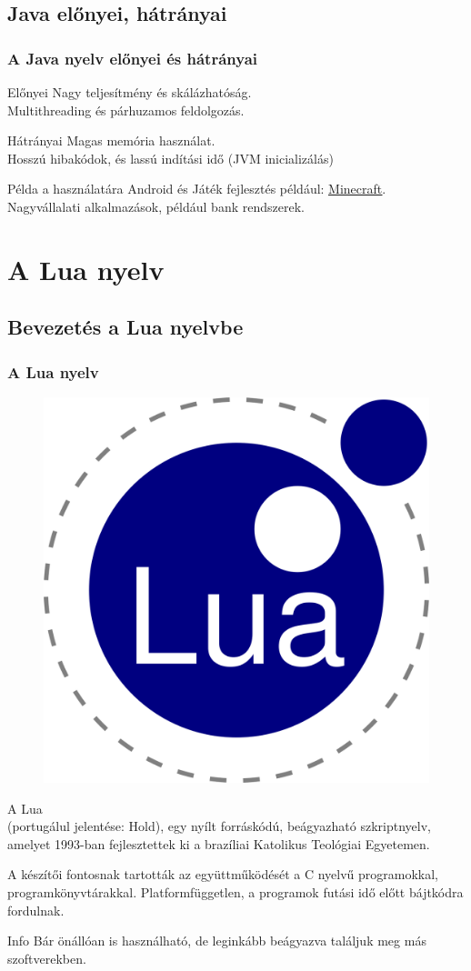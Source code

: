 \documentclass[10pt]{beamer}
\newcommand{\hyperstyle}[1]{{\color{hyperpurple}\underline{#1}}}
\begin{document}
	\subsection{Java előnyei, hátrányai}
	\begin{frame}
		\frametitle{A Java nyelv előnyei és hátrányai}

		\begin{block}{Előnyei}
			Nagy teljesítmény és skálázhatóság. \\ Multithreading és párhuzamos
			feldolgozás.
		\end{block}
		\begin{alertblock}{Hátrányai}
			Magas memória használat. \\ Hosszú hibakódok, és lassú indítási idő (JVM
			inicializálás)
		\end{alertblock}
		\begin{exampleblock}{Példa a használatára}
			Android és Játék fejlesztés például: \hyperstyle{\href{https://www.minecraft.net/en-us}{Minecraft}}.
			\\ Nagyvállalati alkalmazások, például bank rendszerek.
		\end{exampleblock}
	\end{frame}

	\transboxin
	\section{A Lua nyelv}
	\subsection{Bevezetés a Lua nyelvbe}
	\begin{frame}
		\frametitle{A Lua nyelv}
		\hypertarget{lua}{}

		\begin{figure}
			\includegraphics[height=0.15\textwidth]{lua-logo.png} %
		\end{figure}

		\hspace{0.25cm} A Lua\\(portugálul jelentése: Hold), egy nyílt forráskódú,
		beágyazható szkriptnyelv, amelyet 1993-ban fejlesztettek ki a brazíliai Katolikus
		Teológiai Egyetemen. \pause
		
		\vspace{0.5cm}
		A készítői fontosnak tartották az
		együttműködését a C nyelvű programokkal, programkönyvtárakkal.
		Platformfüggetlen, a programok futási idő előtt bájtkódra fordulnak. \pause

		\vspace{1cm}
		\begin{block}{Info}
			Bár önállóan is használható, de leginkább beágyazva találjuk meg más
			szoftverekben.
		\end{block}
	\end{frame}
\end{document}
